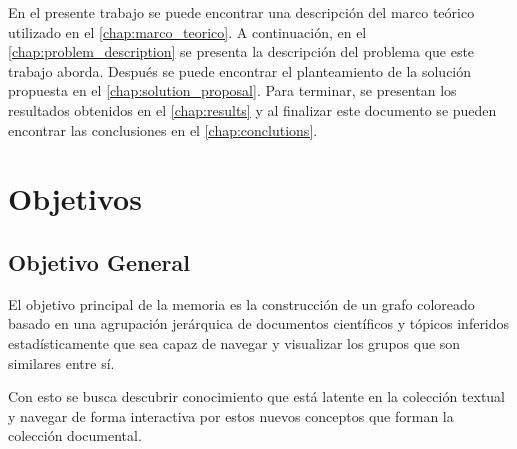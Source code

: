 \documentclass[12pt,oneside,letterpaper]{book}
\theoremstyle{definition}
\begin{document}
En el presente trabajo se puede encontrar una descripción del marco teórico utilizado en el \autoref{chap:marco_teorico}. A continuación, en el \autoref{chap:problem_description} se presenta la descripción del problema que este trabajo aborda. Después se puede encontrar el planteamiento de la solución propuesta en el \autoref{chap:solution_proposal}. Para terminar, se presentan los resultados obtenidos en el \autoref{chap:results} y al finalizar este documento se pueden encontrar las conclusiones en el \autoref{chap:conclutions}.
\chapter{Objetivos}
\label{chap:goals}
\section{Objetivo General}
\label{sec:objetivo_general}
El objetivo principal de la memoria es la construcción de un grafo coloreado basado en una agrupación jerárquica de documentos científicos y tópicos inferidos estadísticamente que sea capaz de navegar y visualizar los grupos que son similares entre sí. 

Con esto se busca descubrir conocimiento que está latente en la colección textual y navegar de forma interactiva por estos nuevos conceptos que forman la colección documental. 
\end{document}
